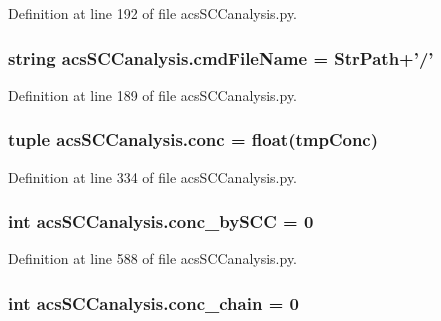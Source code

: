 Definition at line 192 of file acs\+S\+C\+Canalysis.\+py.

\hypertarget{a00130_a32551f85ad3cd8080b8ad81828276368}{
\subsubsection[{cmd\+File\+Name}]{\setlength{\rightskip}{0pt plus 5cm}string acs\+S\+C\+Canalysis.\+cmd\+File\+Name = {\bf Str\+Path}+'/'}}\label{a00130_a32551f85ad3cd8080b8ad81828276368}


Definition at line 189 of file acs\+S\+C\+Canalysis.\+py.

\hypertarget{a00130_a6ec435b19c74f79f32a0eae7bb2bd1c8}{
\subsubsection[{conc}]{\setlength{\rightskip}{0pt plus 5cm}tuple acs\+S\+C\+Canalysis.\+conc = float(tmp\+Conc)}}\label{a00130_a6ec435b19c74f79f32a0eae7bb2bd1c8}


Definition at line 334 of file acs\+S\+C\+Canalysis.\+py.

\hypertarget{a00130_aac2f508d526d62bd7f9d4f5a5f8b1821}{
\subsubsection[{conc\+\_\+by\+S\+C\+C}]{\setlength{\rightskip}{0pt plus 5cm}int acs\+S\+C\+Canalysis.\+conc\+\_\+by\+S\+C\+C = 0}}\label{a00130_aac2f508d526d62bd7f9d4f5a5f8b1821}


Definition at line 588 of file acs\+S\+C\+Canalysis.\+py.

\hypertarget{a00130_a3188cc39362e42ecb36d23a98f2b5a78}{
\subsubsection[{conc\+\_\+chain}]{\setlength{\rightskip}{0pt plus 5cm}int acs\+S\+C\+Canalysis.\+conc\+\_\+chain = 0}}\label{a00130_a3188cc39362e42ecb36d23a98f2b5a78}


